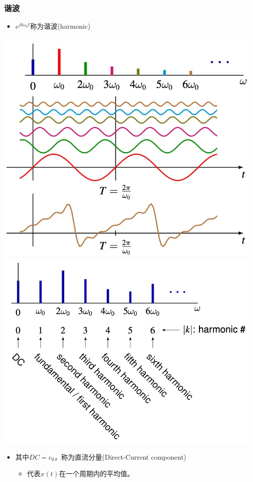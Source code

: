 \documentclass[CJKutf8,xcolor=pdftex,dvipsnames,table]{beamer}
\begin{document}
\begin{CJK*}{UTF8}{song}
  \begin{frame}
    \frametitle{谐波}
    \begin{itemize}
    \item $e^{jk\omega_0 t}$称为谐波(harmonic)
	\end{itemize}  
    \begin{center}
      \includegraphics[scale=.2]{harmonic-1}
      \includegraphics[scale=.2]{harmonic-2}
    \end{center}
    \begin{itemize}
    \item 其中$DC=c_0$，称为直流分量(Direct-Current component) 
      	\begin{itemize}
		\item 代表$x(t)$在一个周期内的平均值。
		\end{itemize}
    \end{itemize}   
  \end{frame}


\end{CJK*}
\end{document}
